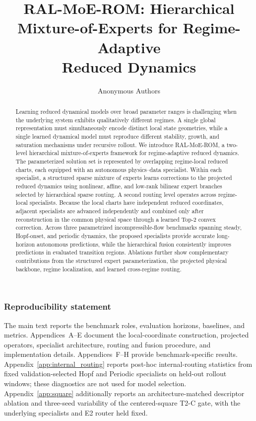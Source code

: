\documentclass{article}
\title{RAL-MoE-ROM: Hierarchical\\
Mixture-of-Experts for Regime-Adaptive\\
Reduced Dynamics}
\author{Anonymous Authors}
\begin{document}
\maketitle

\begin{abstract}
Learning reduced dynamical models over broad parameter ranges is challenging when the underlying system exhibits qualitatively different regimes. A single global representation must simultaneously encode distinct local state geometries, while a single learned dynamical model must reproduce different stability, growth, and saturation mechanisms under recursive rollout. We introduce RAL-MoE-ROM, a two-level hierarchical mixture-of-experts framework for regime-adaptive reduced dynamics. The parameterized solution set is represented by overlapping regime-local reduced charts, each equipped with an autonomous physics--data specialist. Within each specialist, a structured sparse mixture of experts learns corrections to the projected reduced dynamics using nonlinear, affine, and low-rank bilinear expert branches selected by hierarchical sparse routing. A second routing level operates across regime-local specialists. Because the local charts have independent reduced coordinates, adjacent specialists are advanced independently and combined only after reconstruction in the common physical space through a learned Top-2 convex correction. Across three parametrized incompressible-flow benchmarks spanning steady, Hopf-onset, and periodic dynamics, the proposed specialists provide accurate long-horizon autonomous predictions, while the hierarchical fusion consistently improves predictions in evaluated transition regions. Ablations further show complementary contributions from the structured expert parameterization, the projected physical backbone, regime localization, and learned cross-regime routing.
\end{abstract}





\FloatBarrier



\subsubsection*{Reproducibility statement}
The main text reports the benchmark roles, evaluation horizons, baselines, and metrics. Appendices~A--E document the local-coordinate construction, projected operators, specialist architecture, routing and fusion procedure, and implementation details. Appendices~F--H provide benchmark-specific results.
Appendix~\ref{app:internal_routing} reports post-hoc internal-routing statistics
from fixed validation-selected Hopf and Periodic specialists on held-out
rollout windows; these diagnostics are not used for model selection.
Appendix~\ref{app:square} additionally reports an architecture-matched descriptor
ablation and three-seed variability of the centered-square T2-C gate, with the
underlying specialists and E2 router held fixed.
\end{document}
